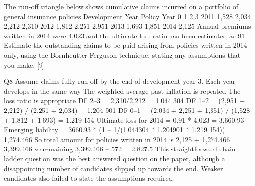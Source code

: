 \documentclass[a4paper,12pt]{article}
\begin{document}
 The run-off triangle below shows cumulative claims incurred on a portfolio of
general insurance policies
Development Year
Policy Year 0 1 2 3
2011 1,528 2,034 2,212 2,310
2012 1,812 2,251 2,951
2013 1,693 1,851
2014 2,125
Annual premiums written in 2014 were 4,023 and the ultimate loss ratio has been estimated as 91%
Estimate the outstanding claims to be paid arising from policies written in 2014 only, using the Bornheutter-Ferguson technique, stating any assumptions that you
make. [9]


\newpage

Q8 Assume claims fully run off by the end of development year 3.
Each year develops in the same way
The weighted average past inflation is repeated
The loss ratio is appropriate
DF 2–3 = 2,310/2,212 = 1.044 304
DF 1–2 = (2,951 + 2,212) / (2,251 + 2,034) = 1.204 901
DF 0–1 = (2,034 + 2,251 + 1,851) / (1,528 + 1,812 + 1,693) = 1.219 154
Ultimate loss for 2014 = 0.91 * 4,023 = 3,660.93
Emerging liability = 3660.93 * (1 – 1/(1.044304 * 1.204901 * 1.219 154))
= 1,274.466
So total amount for policies written in 2014 is
2,125 + 1,274.466 = 3,399.466
so remaining
3,399.466 – 572 = 2,827.5
This straightforward chain ladder question was the best answered question on
the paper, although a disappointing number of candidates slipped up towards
the end. Weaker candidates also failed to state the assumptions required.
\end{document}
